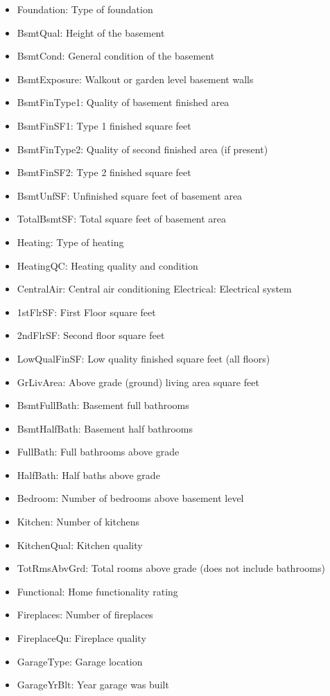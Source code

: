 \documentclass[sigconf]{acmart}
\begin{document}
\begin{itemize}
	\item Foundation: Type of foundation
	\item BsmtQual: Height of the basement
	\item BsmtCond: General condition of the basement
	\item BsmtExposure: Walkout or garden level basement walls
	\item BsmtFinType1: Quality of basement finished area
	\item BsmtFinSF1: Type 1 finished square feet
	\item BsmtFinType2: Quality of second finished area (if present)
	\item BsmtFinSF2: Type 2 finished square feet
	\item BsmtUnfSF: Unfinished square feet of basement area
	\item TotalBsmtSF: Total square feet of basement area
	\item Heating: Type of heating
	\item HeatingQC: Heating quality and condition
	\item CentralAir: Central air conditioning Electrical: Electrical system
	\item 1stFlrSF: First Floor square feet
	\item 2ndFlrSF: Second floor square feet
	\item LowQualFinSF: Low quality finished square feet (all floors)
	\item GrLivArea: Above grade (ground) living area square feet
	\item BsmtFullBath: Basement full bathrooms
	\item BsmtHalfBath: Basement half bathrooms
	\item FullBath: Full bathrooms above grade
	\item HalfBath: Half baths above grade
	\item Bedroom: Number of bedrooms above basement level
	\item Kitchen: Number of kitchens
	\item KitchenQual: Kitchen quality
	\item TotRmsAbvGrd: Total rooms above grade (does not include bathrooms)
	\item Functional: Home functionality rating
	\item Fireplaces: Number of fireplaces
	\item FireplaceQu: Fireplace quality
	\item GarageType: Garage location
	\item GarageYrBlt: Year garage was built

\end{itemize}
\end{document}
